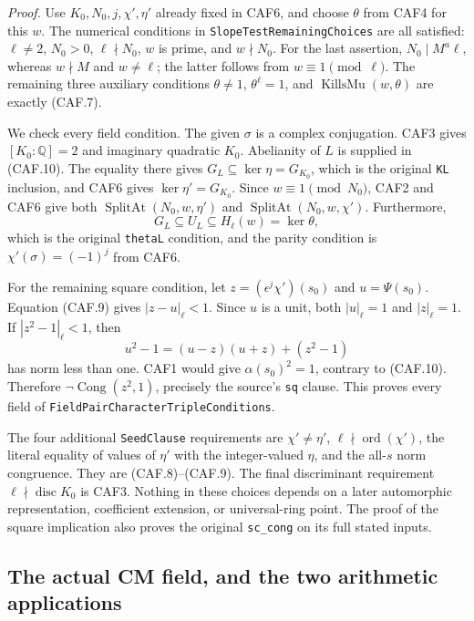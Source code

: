 \documentclass[11pt,a4paper]{article}
\numberwithin{equation}{section}
\theoremstyle{remark}\newtheorem{remark}[theorem]{Remark}
\begin{document}
\emph{Proof.}
Use \(K_0,N_0,j,\chi',\eta'\) already fixed in CAF6, and choose
\(\theta\) from CAF4 for this \(w\).  The numerical conditions in
\texttt{Slope\allowbreak Test\allowbreak Remaining\allowbreak Choices} are all satisfied: \(\ell\ne2\),
\(N_0>0\), \(\ell\nmid N_0\), \(w\) is prime, and
\(w\nmid N_0\).  For the last assertion, \(N_0\mid M^a\ell\),
whereas \(w\nmid M\) and \(w\ne\ell\); the latter follows from
\(w\equiv1\pmod\ell\).  The remaining three auxiliary conditions
\(\theta\ne1\), \(\theta^\ell=1\), and
\(\operatorname{KillsMu}(w,\theta)\) are exactly (CAF.7).

We check every field condition.  The given \(\sigma\) is a complex
conjugation.  CAF3 gives \([K_0:\mathbb Q]=2\) and imaginary
quadratic \(K_0\).  Abelianity of \(L\) is supplied in (CAF.10).
The equality there gives
\(G_L\subseteq\ker\eta=G_{K_0}\), which is the original
\texttt{KL} inclusion, and CAF6 gives
\(\ker\eta'=G_{K_0}\).  Since \(w\equiv1\pmod {N_0}\),
CAF2 and CAF6 give both
\(\operatorname{SplitAt}(N_0,w,\eta')\) and
\(\operatorname{SplitAt}(N_0,w,\chi')\).  Furthermore,
\[
        G_L\subseteq U_L\subseteq H_\ell(w)=\ker\theta,
\]
which is the original \texttt{theta\allowbreak L} condition, and the parity
condition is \(\chi'(\sigma)=(-1)^j\) from CAF6.

For the remaining square condition, let
\(z=(\epsilon^j\chi')(s_0)\) and \(u=\Psi(s_0)\).
Equation (CAF.9) gives \(|z-u|_\ell<1\).  Since \(u\) is a
unit, both \(|u|_\ell=1\) and \(|z|_\ell=1\).
If \(|z^2-1|_\ell<1\), then
\[
 u^2-1=(u-z)(u+z)+(z^2-1)
\]
has norm less than one.  CAF1 would give
\(\alpha(s_0)^2=1\), contrary to (CAF.10).  Therefore
\(\neg\operatorname{Cong}(z^2,1)\), precisely the source's
\texttt{sq} clause.  This proves every field of
\texttt{FieldPair\allowbreak{}Character\allowbreak{}TripleConditions}.

The four additional \texttt{Seed\allowbreak Clause} requirements are
\(\chi'\ne\eta'\), \(\ell\nmid\operatorname{ord}(\chi')\),
the literal equality of values of \(\eta'\) with the integer-valued
\(\eta\), and the all-\(s\) norm congruence.  They are (CAF.8)--(CAF.9).
The final discriminant requirement \(\ell\nmid\operatorname{disc}K_0\)
is CAF3.  Nothing in these choices depends on a later automorphic
representation, coefficient extension, or universal-ring point.
The proof of the square implication also proves the original
\texttt{sc\_\allowbreak cong} on its full stated inputs.

\subsection{The actual CM field, and the two arithmetic applications}
\end{document}
